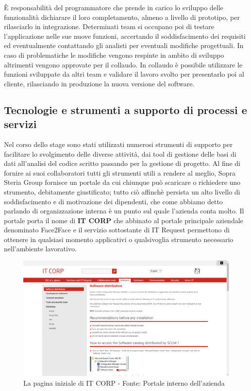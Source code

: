 	È responsabilità del programmatore che prende in carico lo sviluppo delle funzionalità dichiarare il loro completamento, almeno a livello di prototipo, per rilasciarlo in integrazione. Determinati team si occupano poi di testare l'applicazione nelle sue nuove funzioni, accertando il soddisfacimento dei requisiti ed eventualmente contattando gli analisti per eventuali modifiche progettuali. In caso di problematiche le modifiche vengono respinte in ambito di sviluppo altrimenti vengono approvate per il collaudo. In collaudo è possibile utilizzare le funzioni sviluppate da altri team e validare il lavoro svolto per presentarlo poi al cliente, rilasciando in produzione la nuova versione del software.
	
	\subsection{Tecnologie e strumenti a supporto di processi e servizi}

	Nel corso dello stage sono stati utilizzati numerosi strumenti di supporto per facilitare lo svolgimento delle diverse attività, dai tool di gestione delle basi di dati all'analisi del codice scritto passando per la gestione di progetto. Al fine di fornire ai suoi collaboratori tutti gli strumenti utili a rendere al meglio, Sopra Steria Group fornisce un portale da cui chiunque può scaricare o richiedere uno strumento, debitamente giustificato; tutto ciò affinchè persista un alto livello di soddisfacimento e di motivazione dei dipendenti, che come abbiamo detto parlando di organizzazione interna è un punto sul quale l'azienda conta molto. Il portale porta il nome di \textbf{IT CORP} che abbinato al portale principale aziendale denominato Face2Face e il servizio sottostante di IT Request permettono di ottenere in qualsiasi momento applicativi o qualsivoglia strumento necessario nell'ambiente lavorativo.

	\begin{figure}[H]
		\centering
	   	\includegraphics[width=1\textwidth]{immagini/ITCorp}
	   	\caption{La pagina iniziale di IT CORP - Fonte: Portale interno dell'azienda}
	\end{figure}
	
